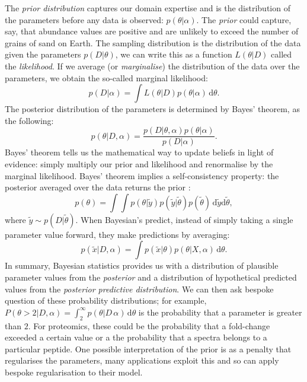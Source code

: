 \documentclass[12pt,english, journal=jpr, layout=twocolumn]{article}
\begin{document}
The \textit{prior distribution} captures our domain expertise and is the distribution of the parameters before any data is observed: $p(\theta|\alpha)$. The \textit{prior} could capture, say, that abundance values are positive and are unlikely to exceed the number of grains of sand on Earth. The sampling distribution is the distribution of the data given the parameters $p(D|\theta)$, we can write this as a function $L(\theta|D)$ called the \textit{likelihood}. If we average (or \textit{marginalise}) the distribution of the data over the parameters, we obtain the so-called marginal likelihood:
\begin{equation}
p(D|\alpha) = \int L(\theta|D)p(\theta|\alpha)\,\text{d}\theta.
\end{equation}
The posterior distribution of the parameters is determined by Bayes' theorem, as the following:
\begin{equation}
p(\theta|D, \alpha) = \frac{p(D|\theta, \alpha)p(\theta|\alpha)}{p(D|\alpha)}.
\end{equation}
Bayes' theorem tells us the mathematical way to update beliefs in light of evidence: simply multiply our prior and likelihood and renormalise by the marginal likelihood. Bayes' theorem implies a self-consistency property: the posterior averaged over the data returns the prior \citep{Talts::2018}:
\begin{equation}
p(\theta) = \int \int p(\theta|\tilde{y})p(\tilde{y}|\tilde{\theta})p(\tilde{\theta})\,\text{d}\tilde{y}\text{d}\tilde{\theta},
\end{equation}
where $\tilde{y} \sim p(D|\tilde{\theta})$. When Bayesian's predict, instead of simply taking a single parameter value forward, they make predictions by averaging:
\begin{equation}
p(\tilde{x}|D,\alpha) = \int p(\tilde{x}|\theta)p(\theta|X,\alpha)\,\text{d}\theta.
\end{equation}
In summary, Bayesian statistics provides us with a distribution of plausible parameter values from the \textit{posterior} and a distribution of hypothetical predicted values from the \textit{posterior predictive distribution}. We can then ask bespoke question of these probability distributions; for example, $P(\theta > 2|D, \alpha) = \int_{2}^{\infty}p(\theta|D\,\alpha)\,\text{d}\theta$ is the probability that a parameter is greater than $2$. For proteomics, these could be the probability that a fold-change exceeded a certain value or a the probability that a spectra belongs to a particular peptide. One possible interpretation of the prior is as a penalty that regularises the parameters, many applications exploit this and so can apply bespoke regularisation to their model. 
\end{document}
